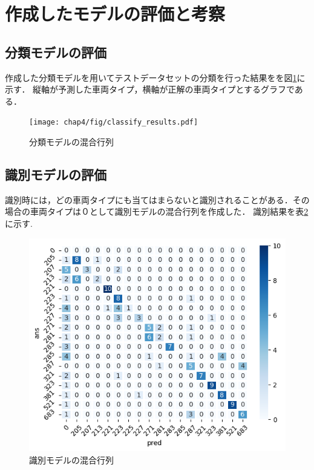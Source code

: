 \section{作成したモデルの評価と考察}

\subsection{分類モデルの評価}
作成した分類モデルを用いてテストデータセットの分類を行った結果をを図\ref{CLS}に示す．
縦軸が予測した車両タイプ，横軸が正解の車両タイプとするグラフである．
\begin{figure}	[H]
	\centering
	\texttt{[image: chap4/fig/classify\_results.pdf]}
	\caption{分類モデルの混合行列}
	\label{CLS}
\end{figure}

\subsection{識別モデルの評価}
識別時には，どの車両タイプにも当てはまらないと識別されることがある．その場合の車両タイプは０として識別モデルの混合行列を作成した．
識別結果を表\ref{fig:chartdet} に示す.\\
\begin{figure}[H]
	\centering
	\includegraphics[width=\linewidth]{chap4/fig/predicted_results.jpg}
	\caption{識別モデルの混合行列}
	\label{fig:chartdet}
\end{figure}



